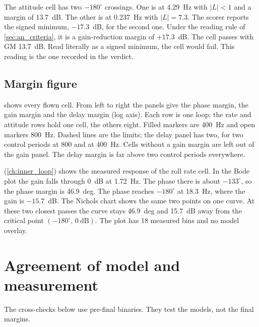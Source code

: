 The attitude cell has two $-180^\circ$ crossings.
One is at 4.29~Hz with $|L|<1$ and a margin of 13.7~dB.
The other is at 0.237~Hz with $|L|=7.3$.
The scorer reports the signed minimum, $-17.3$~dB, for the second one.
Under the reading rule of \cref{sec:an_criteria}, it is a gain-reduction margin of $+17.3$~dB.
The cell passes with GM 13.7~dB.
Read literally as a signed minimum, the cell would fail.
This reading is the one recorded in the verdict.

\subsection{Margin figure}\label{sec:an_fig}

 shows every flown cell.
From left to right the panels give the phase margin, the gain margin and the delay margin (log axis).
Each row is one loop; the rate and attitude rows hold one cell, the others eight.
Filled markers are 400~Hz and open markers 800~Hz.
Dashed lines are the limits; the delay panel has two, for two control periods at 800 and at 400~Hz.
Cells without a gain margin are left out of the gain panel.
The delay margin is far above two control periods everywhere.

 (\cref{ch:inner_loop}) shows the measured response of the roll rate cell.
In the Bode plot the gain falls through 0~dB at 1.72~Hz.
The phase there is about $-133^\circ$, so the phase margin is 46.9~deg.
The phase reaches $-180^\circ$ at 18.3~Hz, where the gain is $-15.7$~dB.
The Nichols chart shows the same two points on one curve.
At these two closest passes the curve stays 46.9~deg and 15.7~dB away from the critical point $(-180^\circ,\,0~\mathrm{dB})$.
The plot has 18 measured bins and no model overlay.

\section{Agreement of model and measurement}\label{sec:an_agree}

The cross-checks below use pre-final binaries.
They test the models, not the final margins.


